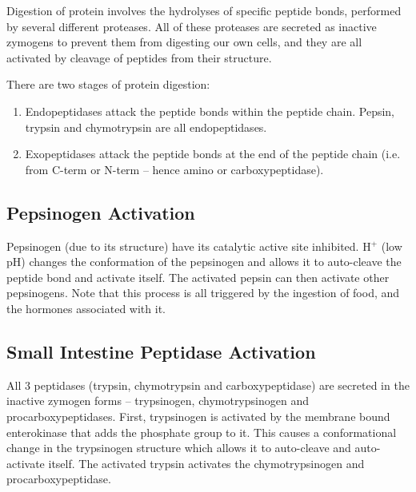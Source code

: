 Digestion of protein involves the hydrolyses of specific peptide bonds, performed by several different proteases.
All of these proteases are secreted as inactive zymogens to prevent them from digesting our own cells, and they are all activated by cleavage of peptides from their structure.

There are two stages of protein digestion:
\begin{enumerate}
\item Endopeptidases attack the peptide bonds within the peptide chain. Pepsin, trypsin and chymotrypsin are all endopeptidases.
\item Exopeptidases attack the peptide bonds at the end of the peptide chain (i.e. from C-term or N-term -- hence amino or carboxypeptidase).
\end{enumerate}

\subsection{Pepsinogen Activation}

\begin{center}
\end{center}

Pepsinogen (due to its structure) have its catalytic active site inhibited.
H$^+$ (low pH) changes the conformation of the pepsinogen and allows it to auto-cleave the peptide bond and activate itself.
The activated pepsin can then activate other pepsinogens.
Note that this process is all triggered by the ingestion of food, and the hormones associated with it.

\subsection{Small Intestine Peptidase Activation}

\begin{center}
\end{center}

All 3 peptidases (trypsin, chymotrypsin and carboxypeptidase) are secreted in the inactive zymogen forms -- trypsinogen, chymotrypsinogen and procarboxypeptidases.
First, trypsinogen is activated by the membrane bound enterokinase that adds the phosphate group to it.
This causes a conformational change in the trypsinogen structure which allows it to auto-cleave and auto-activate itself.
The activated trypsin activates the chymotrypsinogen and procarboxypeptidase.

